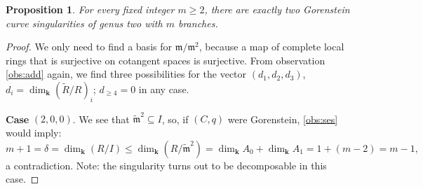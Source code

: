 \documentclass{compositio}
\renewcommand{\k}{\mathbf k}
\newcommand{\m}{\mathfrak m}
\newcommand{\tR}{\widetilde{R}}
\newcommand{\tm}{\widetilde{\mathfrak m}}
\theoremstyle{plain}
\newtheorem{prop}[thm]{Proposition}
\theoremstyle{definition}
\theoremstyle{remark}
\begin{document}
\begin{prop}\label{prop:classification}
 For every fixed integer $m\geq 2$, there are exactly two Gorenstein curve singularities of genus two with $m$ branches.
\end{prop}
\begin{proof}
 We only need to find a basis for $\m/\m^2$, because a map of complete local rings that is surjective on cotangent spaces is surjective. From observation \eqref{obs:add} again, we find three possibilities for the vector $(d_1,d_2,d_3)$, $d_i=\dim_{\k}(\tR/R)_i$; $d_{\geq 4}=0$ in any case.
 
 \smallskip
 
 \textbf{Case} $(2,0,0)$. We see that $\tm^2\subseteq I$, so, if $(C,q)$ were Gorenstein, \eqref{obs:ses} would imply: \[m+1=\delta=\dim_\k(R/I)\leq \dim_\k(R/\tm^2)=\dim_\k A_0+\dim_\k A_1=1+(m-2)=m-1,\] a contradiction. Note: the singularity turns out to be decomposable in this case.
 
 \smallskip
 

\end{proof}
\end{document}
